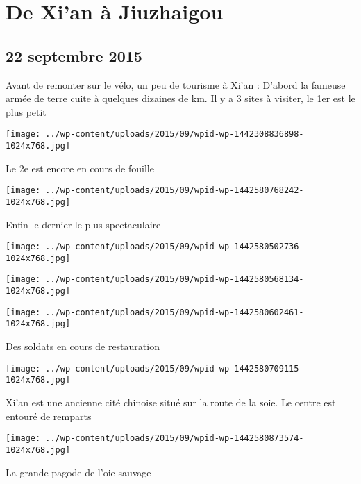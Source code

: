 \chapter{De Xi’an à Jiuzhaigou}
\section*{22 septembre 2015}
Avant de remonter sur le vélo, un peu de tourisme à Xi'an : \newline
 D'abord la fameuse armée de terre cuite à quelques dizaines de km. Il y a 3 sites à visiter, le 1er est le plus petit \newline
 \newline
\centerline{\texttt{[image: ../wp-content/uploads/2015/09/wpid-wp-1442308836898-1024x768.jpg]} } 
 \newline
 Le 2e est encore en cours de fouille \newline
 \newline
\centerline{\texttt{[image: ../wp-content/uploads/2015/09/wpid-wp-1442580768242-1024x768.jpg]} } 
 \newline
 Enfin le dernier le plus spectaculaire \newline
 \newline
\centerline{\texttt{[image: ../wp-content/uploads/2015/09/wpid-wp-1442580502736-1024x768.jpg]} } 
 \newline
 \newline
\centerline{\texttt{[image: ../wp-content/uploads/2015/09/wpid-wp-1442580568134-1024x768.jpg]} } 
 \newline
 \newline
\centerline{\texttt{[image: ../wp-content/uploads/2015/09/wpid-wp-1442580602461-1024x768.jpg]} } 
 \newline
 Des soldats en cours de restauration \newline
 \newline
\centerline{\texttt{[image: ../wp-content/uploads/2015/09/wpid-wp-1442580709115-1024x768.jpg]} } 
 \newline
 Xi'an est une ancienne cité chinoise situé sur la route de la soie. Le centre est entouré de remparts \newline
 \newline
\centerline{\texttt{[image: ../wp-content/uploads/2015/09/wpid-wp-1442580873574-1024x768.jpg]} } 
 \newline
 La grande pagode de l'oie sauvage \newline

